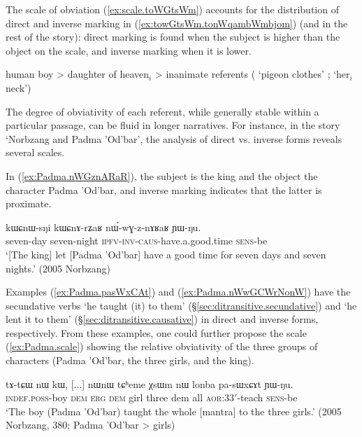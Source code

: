 The scale of obviation (\ref{ex:scale.toWGtsWm}) accounts for the distribution of direct and inverse marking in (\ref{ex:towGtsWm.tonWqambWmbjom}) (and in the rest of the story): direct marking is found when the subject is higher than the object on the scale, and inverse marking when it is lower.

\begin{exe}
\ex \label{ex:scale.toWGtsWm}
\glt human boy > daughter of heaven$_i$ > inanimate referents ( `pigeon clothes' ;  `her$_i$ neck')
\end{exe}

The degree of obviativity of each referent, while generally stable within a particular passage, can be fluid in longer narratives. For instance, in the story `Norbzang and Padma 'Od'bar', the analysis of direct vs. inverse forms reveals several scales. 

In (\ref{ex:Padma.nWGznARaR}), the subject is the king and the object the character Padma 'Od'bar, and inverse marking indicates that the latter is proximate.
\largerpage
\begin{exe}
\ex \label{ex:Padma.nWGznARaR}
\gll kɯɕnɯ-sŋi kɯɕnɤ-rʑaʁ nɯ́-wɣ-z-nɤʁaʁ ɲɯ-ŋu. \\
seven-day seven-night \textsc{ipfv}-\textsc{inv}-\textsc{caus}-have.a.good.time \textsc{sens}-be \\
\glt `[The king] let [Padma 'Od'bar] have a good time for seven days and seven nights.' (2005 Norbzang)
\end{exe}

Examples (\ref{ex:Padma.pasWxCAt}) and (\ref{ex:Padma.nWwGCWrNonW}) have the secundative verbs  `he taught (it) to them' (§\ref{sec:ditransitive.secundative}) and  `he lent it to them' (§\ref{sec:ditransitive.causative}) in direct and inverse forms, respectively. From these examples, one could further propose the scale (\ref{ex:Padma.scale}) showing the relative obviativity of the three groups of characters (Padma 'Od'bar, the three girls, and the king).

\begin{exe}
\ex \label{ex:Padma.pasWxCAt}
\gll tɤ-tɕɯ nɯ kɯ, [...] nɯnɯ tɕʰeme χsɯm nɯ lonba pa-sɯxɕɤt ɲɯ-ŋu. \\
\textsc{indef}.\textsc{poss}-boy \textsc{dem} \textsc{erg} { } \textsc{dem} girl three dem all \textsc{aor}:3\fl{}3$'$-teach \textsc{sens}-be \\
\glt `The boy (Padma 'Od'bar) taught the whole [mantra] to the three girls.' (2005 Norbzang, 380; Padma 'Od'bar > girls)
\end{exe}

